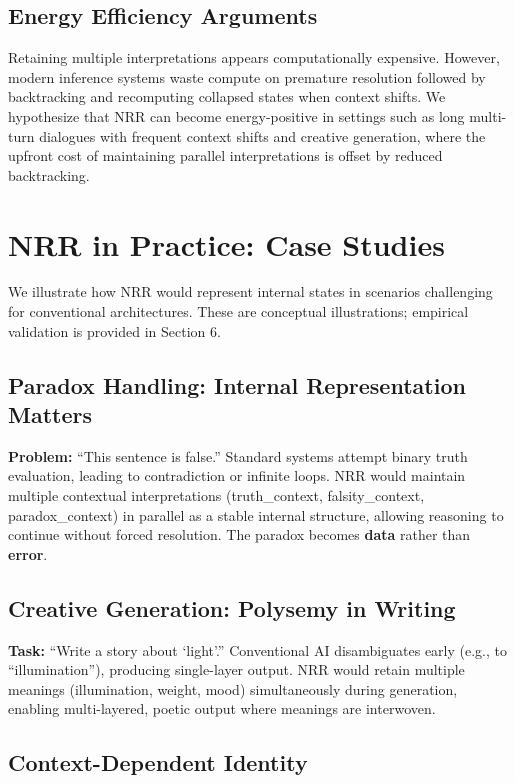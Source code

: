 \documentclass[11pt,a4paper]{article}
\begin{document}
\subsection{Energy Efficiency Arguments}

Retaining multiple interpretations appears computationally expensive.
However, modern inference systems waste compute on premature resolution followed by backtracking and recomputing collapsed states when context shifts.
We hypothesize that NRR can become energy-positive in settings such as long multi-turn dialogues with frequent context shifts and creative generation, where the upfront cost of maintaining parallel interpretations is offset by reduced backtracking.

\section{NRR in Practice: Case Studies}

We illustrate how NRR would represent internal states in scenarios challenging for conventional architectures. These are conceptual illustrations; empirical validation is provided in Section 6.

\subsection{Paradox Handling: Internal Representation Matters}

\textbf{Problem:} ``This sentence is false.''
Standard systems attempt binary truth evaluation, leading to contradiction or infinite loops.
NRR would maintain multiple contextual interpretations (truth\_context, falsity\_context, paradox\_context) in parallel as a stable internal structure, allowing reasoning to continue without forced resolution.
The paradox becomes \textbf{data} rather than \textbf{error}.

\subsection{Creative Generation: Polysemy in Writing}

\textbf{Task:} ``Write a story about `light'.''
Conventional AI disambiguates early (e.g., to ``illumination''), producing single-layer output.
NRR would retain multiple meanings (illumination, weight, mood) simultaneously during generation, enabling multi-layered, poetic output where meanings are interwoven.

\subsection{Context-Dependent Identity}
\end{document}
